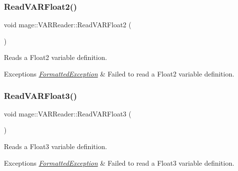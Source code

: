 \subsubsection{\texorpdfstring{Read\+V\+A\+R\+Float2()}{ReadVARFloat2()}}
{\footnotesize\ttfamily void mage\+::\+V\+A\+R\+Reader\+::\+Read\+V\+A\+R\+Float2 (\begin{DoxyParamCaption}{ }\end{DoxyParamCaption})\hspace{0.3cm}{\ttfamily [private]}}

Reads a Float2 variable definition.


\begin{DoxyExceptions}{Exceptions}
{\em \hyperlink{classmage_1_1_formatted_exception}{Formatted\+Exception}} & Failed to read a Float2 variable definition. \\
\hline
\end{DoxyExceptions}
\hypertarget{classmage_1_1_v_a_r_reader_a96e2af0f4462192867da2beead30ca67}{}\label{classmage_1_1_v_a_r_reader_a96e2af0f4462192867da2beead30ca67} 
\subsubsection{\texorpdfstring{Read\+V\+A\+R\+Float3()}{ReadVARFloat3()}}
{\footnotesize\ttfamily void mage\+::\+V\+A\+R\+Reader\+::\+Read\+V\+A\+R\+Float3 (\begin{DoxyParamCaption}{ }\end{DoxyParamCaption})\hspace{0.3cm}{\ttfamily [private]}}

Reads a Float3 variable definition.


\begin{DoxyExceptions}{Exceptions}
{\em \hyperlink{classmage_1_1_formatted_exception}{Formatted\+Exception}} & Failed to read a Float3 variable definition. \\
\hline
\end{DoxyExceptions}
\hypertarget{classmage_1_1_v_a_r_reader_a6f14f9f9696e32090f262682c519bc10}{}\label{classmage_1_1_v_a_r_reader_a6f14f9f9696e32090f262682c519bc10} 
